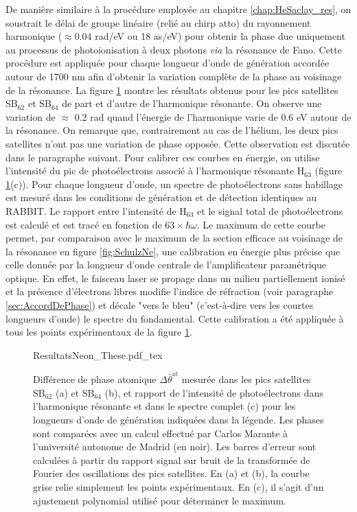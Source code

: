 De manière similaire à la procédure employée au chapitre \ref{chap:HeSaclay_res}, on soustrait le délai de groupe linéaire (relié au chirp atto) du rayonnement harmonique ($\approx 0.04$ rad/eV ou 18 as/eV) pour obtenir la phase due uniquement au processus de photoionisation à deux photons \textit{via} la résonance de Fano. Cette procédure est appliquée pour chaque longueur d'onde de génération accordée autour de 1700 nm afin d'obtenir la variation complète de la phase au voisinage de la résonance. La figure \ref{fig:ResultatsNe} montre les résultats obtenus pour les pics satellites SB$_{62}$ et SB$_{64}$ de part et d'autre de l'harmonique résonante. On observe une variation de $\approx$ 0.2 rad quand l'énergie de l'harmonique varie de 0.6 eV autour de la résonance. On remarque que, contrairement au cas de l'hélium, les deux pics satellites n'ont pas une variation de phase opposée. Cette observation est discutée dans le paragraphe suivant. Pour calibrer ces courbes en énergie, on utilise l'intensité du pic de photoélectrons associé à l'harmonique résonante H$_{63}$ (figure \ref{fig:ResultatsNe}(c)). Pour chaque longueur d'onde, un spectre de photoélectrons sans habillage est mesuré dans les conditions de génération et de détection identiques au RABBIT. Le rapport entre l'intensité de H$_{63}$ et le signal total de photoélectrons est calculé et est tracé en fonction de $63 \times \hbar \omega$. Le maximum de cette courbe permet, par comparaison avec le maximum de la section efficace au voisinage de la résonance en figure \ref{fig:SchulzNe}, une calibration en énergie plus précise que celle donnée par la longueur d'onde centrale de l'amplificateur paramétrique optique. En effet, le faisceau laser se propage dans un milieu partiellement ionisé et la présence d'électrons libres modifie l'indice de réfraction (voir paragraphe \ref{sec:AccordDePhase}) et décale "vers le bleu" (c'est-à-dire vers les courtes longueurs d'onde) le spectre du fondamental. Cette calibration a été appliquée à tous les points expérimentaux de la figure \ref{fig:ResultatsNe}.

\begin{figure}
\centering
\def\svgwidth{\textwidth}
{ResultatsNeon_These.pdf_tex}
\caption{Différence de phase atomique $\Delta \bar{\theta}^{\text{at}}$ mesurée dans les pics satellites SB$_{62}$ (a) et SB$_{64}$ (b), et rapport de l'intensité de photoélectrons dans l'harmonique résonante et dans le spectre complet (c) pour les longueurs d'onde de génération indiquées dans la légende. Les phases sont comparées avec un calcul effectué par Carlos Marante à l'université autonome de Madrid (en noir). Les barres d'erreur sont calculées à partir du rapport signal sur bruit de la transformée de Fourier des oscillations des pics satellites. En (a) et (b), la courbe grise relie simplement les points expérimentaux. En (c), il s'agit d'un ajustement polynomial utilisé pour déterminer le maximum.}
\label{fig:ResultatsNe}
\end{figure}

